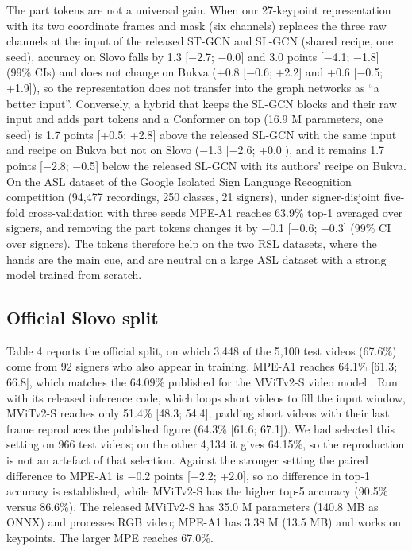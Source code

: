 The part tokens are not a universal gain. When our 27-keypoint representation with its two coordinate frames and mask (six channels) replaces the three raw channels at the input of the released ST-GCN and SL-GCN (shared recipe, one seed), accuracy on Slovo falls by 1.3 {[}−2.7; −0.0{]} and 3.0 points {[}−4.1; −1.8{]} (99\% CIs) and does not change on Bukva (+0.8 {[}−0.6; +2.2{]} and +0.6 {[}−0.5; +1.9{]}), so the representation does not transfer into the graph networks as ``a better input''. Conversely, a hybrid that keeps the SL-GCN blocks and their raw input and adds part tokens and a Conformer on top (16.9 M parameters, one seed) is 1.7 points {[}+0.5; +2.8{]} above the released SL-GCN with the same input and recipe on Bukva but not on Slovo (−1.3 {[}−2.6; +0.0{]}), and it remains 1.7 points {[}−2.8; −0.5{]} below the released SL-GCN with its authors' recipe on Bukva. On the ASL dataset of the Google Isolated Sign Language Recognition competition \citep{2023_kaggle_gislr} (94,477 recordings, 250 classes, 21 signers), under signer-disjoint five-fold cross-validation with three seeds MPE-A1 reaches 63.9\% top-1 averaged over signers, and removing the part tokens changes it by −0.1 {[}−0.6; +0.3{]} (99\% CI over signers). The tokens therefore help on the two RSL datasets, where the hands are the main cue, and are neutral on a large ASL dataset with a strong model trained from scratch.

\hypertarget{official-slovo-split}{%
\subsection{Official Slovo split}\label{official-slovo-split}}

Table 4 reports the official split, on which 3,448 of the 5,100 test videos (67.6\%) come from 92 signers who also appear in training. MPE-A1 reaches 64.1\% {[}61.3; 66.8{]}, which matches the 64.09\% published for the MViTv2-S video model \citep{2023_kapitanov_slovo}. Run with its released inference code, which loops short videos to fill the input window, MViTv2-S reaches only 51.4\% {[}48.3; 54.4{]}; padding short videos with their last frame reproduces the published figure (64.3\% {[}61.6; 67.1{]}). We had selected this setting on 966 test videos; on the other 4,134 it gives 64.15\%, so the reproduction is not an artefact of that selection. Against the stronger setting the paired difference to MPE-A1 is −0.2 points {[}−2.2; +2.0{]}, so no difference in top-1 accuracy is established, while MViTv2-S has the higher top-5 accuracy (90.5\% versus 86.6\%). The released MViTv2-S has 35.0 M parameters (140.8 MB as ONNX) and processes RGB video; MPE-A1 has 3.38 M (13.5 MB) and works on keypoints. The larger MPE reaches 67.0\%.

